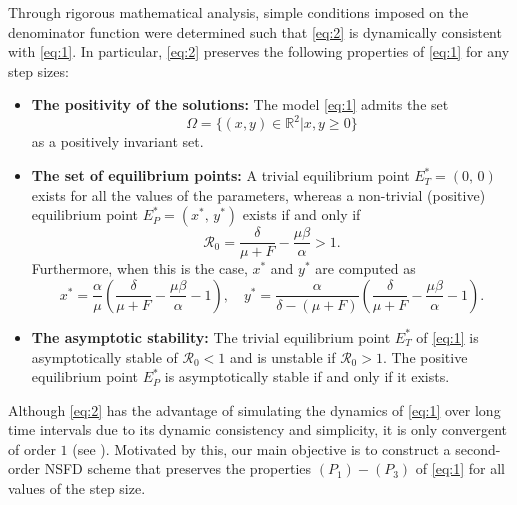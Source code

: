 \documentclass[12pt]{article}
\theoremstyle{definition}
\theoremstyle{remark}
\numberwithin{equation}{section}
\begin{document}
Through rigorous mathematical analysis, simple conditions imposed on the denominator function were determined such that \eqref{eq:2} is dynamically consistent with \eqref{eq:1}. In particular, \eqref{eq:2} preserves the following properties of \eqref{eq:1} for any step sizes:
\begin{itemize}
\item[(\textbf{$P_1$})] \textbf{The positivity of the solutions:} The model \eqref{eq:1} admits the set
\begin{equation}\label{eq:3a}
\Omega = \{(x, y) \in \mathbb{R}^2|x, y \geq 0\}
\end{equation}
as a positively invariant set.
\item[(\textbf{$P_2$})]  \textbf{The set of equilibrium points:} A trivial equilibrium point $E_T^* = (0,\, 0)$ exists for all the values of the parameters, whereas  a non-trivial (positive) equilibrium point $E_P^* = (x^*,\,y^*)$ exists if and only if
\begin{equation*}
\mathcal{R}_0=\frac{\delta}{\mu+F}-\frac{\mu \beta}{\alpha} > 1.
\end{equation*}
Furthermore, when this is the case, $x^*$ and $y^*$ are computed as \cite{Ladino}
\begin{equation}\label{eq:3}
x^*=\dfrac{\alpha}{\mu}\left(\frac{\delta}{\mu+F}-\dfrac{\mu \beta}{\alpha}-1\right), \quad y^*=\dfrac{\alpha}{\delta-(\mu+F)}\left(\dfrac{\delta}{\mu+F}-\dfrac{\mu \beta}{\alpha}-1\right).
\end{equation} 
\item[(\textbf{$P_3$})]  \textbf{The asymptotic stability:} The trivial equilibrium point $E_T^*$ of \eqref{eq:1} is asymptotically stable of $\mathcal{R}_0 < 1$ and is unstable if $\mathcal{R}_0 > 1$. The positive equilibrium point $E_P^*$ is asymptotically stable if and only if it exists.
\end{itemize}
Although \eqref{eq:2} has the advantage of simulating the dynamics of \eqref{eq:1} over long time intervals due to its dynamic consistency and simplicity, it is only convergent of order $1$ (see \cite{HoangValverde}). Motivated by this, our main objective is to construct a second-order NSFD scheme that preserves the properties $(P_1)-(P_3)$ of \eqref{eq:1} for all values of the step size.
\end{document}

